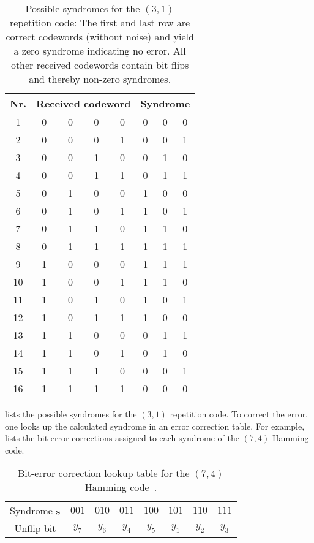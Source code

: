 \begin{table}[htb]
	\centering
	\begin{tabular}{c|cccc|ccc}
		\toprule
		Nr. & \multicolumn{4}{c}{Received codeword} & \multicolumn{3}{c}{Syndrome} \\
		\midrule
			1 & 0 & 0 & 0 & 0 & 0 & 0 & 0 \\
			2 & 0 & 0 & 0 & 1 & 0 & 0 & 1 \\
			3 & 0 & 0 & 1 & 0 & 0 & 1 & 0 \\
			4 & 0 & 0 & 1 & 1 & 0 & 1 & 1 \\
			5 & 0 & 1 & 0 & 0 & 1 & 0 & 0 \\
			6 & 0 & 1 & 0 & 1 & 1 & 0 & 1 \\
			7 & 0 & 1 & 1 & 0 & 1 & 1 & 0 \\
			8 & 0 & 1 & 1 & 1 & 1 & 1 & 1 \\
			9 & 1 & 0 & 0 & 0 & 1 & 1 & 1 \\
			10 & 1 & 0 & 0 & 1 & 1 & 1 & 0 \\
			11 & 1 & 0 & 1 & 0 & 1 & 0 & 1 \\
			12 & 1 & 0 & 1 & 1 & 1 & 0 & 0 \\
			13 & 1 & 1 & 0 & 0 & 0 & 1 & 1 \\
			14 & 1 & 1 & 0 & 1 & 0 & 1 & 0 \\
			15 & 1 & 1 & 1 & 0 & 0 & 0 & 1 \\
			16 & 1 & 1 & 1 & 1 & 0 & 0 & 0 \\
		\bottomrule
	\end{tabular}
	\caption{Possible syndromes for the $(3,1)$ repetition code: The first and last row are correct codewords (without noise) and yield a zero syndrome indicating no error. All other received codewords contain bit flips and thereby non-zero syndromes.}\label{tab:repetition_syndromes}
\end{table}
 lists the possible syndromes for the $(3,1)$ repetition code.
To correct the error, one looks up the calculated syndrome in an error correction table.
For example,  lists the bit-error corrections assigned to each syndrome of the $(7,4)$ Hamming code.
\begin{table}[htb]
	\centering
	\begin{tabular}{cccccccc}
		\toprule
		Syndrome $\vb{s}$ & $001$ & $010$ & $011$ & $100$ & $101$ & $110$ & $111$ \\
		Unflip bit & $y_7$ & $y_6$ & $y_4$ & $y_5$ & $y_1$ & $y_2$ & $y_3$ \\
		\bottomrule
	\end{tabular}
	\caption{Bit-error correction lookup table for the $(7,4)$ Hamming code~\cite[p.~11]{MacKay2003}.}\label{tab:hamming_correction}
\end{table}

